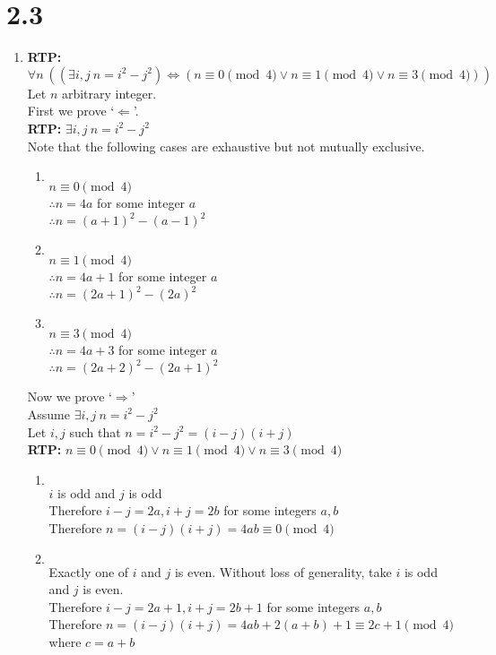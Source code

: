 \documentclass{article}
\newcommand{\rtp}{\textbf{RTP: }}
\newcommand{\myexists}[1]{\exists #1 \:}
\newcommand{\myforall}[1]{\forall #1 \:}
\newcommand{\case}[1]{\item [\textbf{C#1}:]$ $ \\}
\begin{document}
    \section{2.3}
    \begin{enumerate}
        \item \rtp $\myforall{n} ((\myexists{i,j} n=i^2-j^2) \iff (n\equiv 0\pmod{4} \lor n\equiv 1\pmod{4} \lor n\equiv 3\pmod{4}))$
        Let $n$ arbitrary integer. \\
        First we prove `$\Leftarrow$'.\\
        \rtp $\myexists{i,j} n=i^2-j^2$ \\ 
        Note that the following cases are exhaustive but not mutually exclusive.
        \begin{enumerate}
            \case{0} $n \equiv 0 \pmod 4$ \\
                $\therefore n=4a$ for some integer $a$ \\
                $\therefore n=(a+1)^2 - (a-1)^2$
            \case{1} $n \equiv 1 \pmod 4$ \\
                $\therefore n=4a + 1$ for some integer $a$ \\
                $\therefore n=(2a+1)^2 - (2a)^2$
            \case{2} $n \equiv 3 \pmod 4$ \\
                $\therefore n=4a + 3$ for some integer $a$ \\
                $\therefore n=(2a+2)^2 - (2a+1)^2$
        \end{enumerate}
        Now we prove `$\Rightarrow$' \\
        Assume $\myexists{i,j} n=i^2-j^2$ \\
        Let $i, j$ such that $n=i^2-j^2=(i-j)(i+j)$ \\
        \rtp $n\equiv 0\pmod{4} \lor n\equiv 1\pmod{4} \lor n\equiv 3\pmod{4}$
        \begin{enumerate}
            \case{0} $i$ is odd and $j$ is odd \\
                Therefore $i-j = 2a, i+j = 2b$ for some integers $a, b$ \\
                Therefore $n=(i-j)(i+j)=4ab\equiv 0 \pmod{4}$
            \case{1} Exactly one of $i$ and $j$ is even. Without loss of generality, take $i$ is odd and $j$ is even. \\
                Therefore $i-j = 2a+1, i+j = 2b+1$ for some integers $a, b$ \\
                Therefore $n=(i-j)(i+j) = 4ab + 2(a+b) + 1 \equiv 2c + 1 \pmod{4}$ where $c=a+b$ \\

\end{enumerate}
\end{enumerate}
\end{document}
